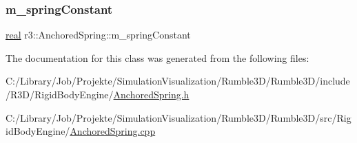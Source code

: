 \mbox{\label{classr3_1_1_anchored_spring_af17c024b5f8a025f5555946c60b52a67}} 
\subsubsection{\texorpdfstring{m\+\_\+spring\+Constant}{m\_springConstant}}
{\footnotesize\ttfamily \mbox{\hyperlink{namespacer3_ab2016b3e3f743fb735afce242f0dc1eb}{real}} r3\+::\+Anchored\+Spring\+::m\+\_\+spring\+Constant\hspace{0.3cm}{\ttfamily [protected]}}



The documentation for this class was generated from the following files\+:\begin{DoxyCompactItemize}
\item 
C\+:/\+Library/\+Job/\+Projekte/\+Simulation\+Visualization/\+Rumble3\+D/\+Rumble3\+D/include/\+R3\+D/\+Rigid\+Body\+Engine/\mbox{\hyperlink{_anchored_spring_8h}{Anchored\+Spring.\+h}}\item 
C\+:/\+Library/\+Job/\+Projekte/\+Simulation\+Visualization/\+Rumble3\+D/\+Rumble3\+D/src/\+Rigid\+Body\+Engine/\mbox{\hyperlink{_anchored_spring_8cpp}{Anchored\+Spring.\+cpp}}\end{DoxyCompactItemize}
